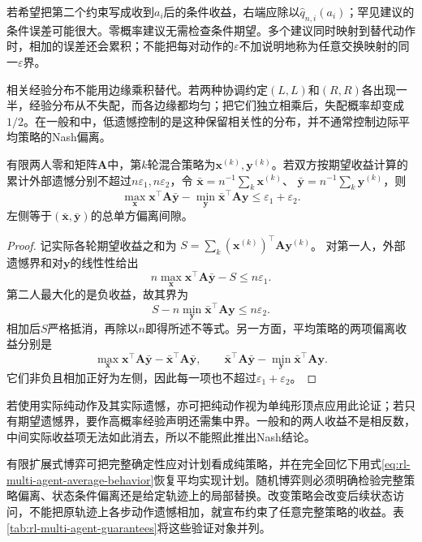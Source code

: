 若希望把第二个约束写成收到$a_i$后的条件收益，右端应除以$\hat q_{n,i}(a_i)$；罕见建议的条件误差可能很大。零概率建议无需检查条件期望。多个建议同时映射到替代动作时，相加的误差还会累积；不能把每对动作的$\varepsilon$不加说明地称为任意交换映射的同一$\varepsilon$界。

相关经验分布不能用边缘乘积替代。若两种协调约定$(L,L)$和$(R,R)$各出现一半，经验分布从不失配，而各边缘都均匀；把它们独立相乘后，失配概率却变成$1/2$。在一般和中，低遗憾控制的是这种保留相关性的分布，并不通常控制边际平均策略的Nash偏离。

\begin{theorem}[零和平均策略的鞍点间隙]
\label{thm:rl-multi-agent-average-gap}
有限两人零和矩阵$\bm A$中，第$k$轮混合策略为$\bm x^{(k)},\bm y^{(k)}$。若双方按期望收益计算的累计外部遗憾分别不超过$n\varepsilon_1,n\varepsilon_2$，令
$\bar{\bm x}=n^{-1}\sum_k\bm x^{(k)}$、
$\bar{\bm y}=n^{-1}\sum_k\bm y^{(k)}$，则
\[
 \max_{\bm x}\bm x^\top\bm A\bar{\bm y}
 -\min_{\bm y}\bar{\bm x}^\top\bm A\bm y
 \leq\varepsilon_1+\varepsilon_2.
\]
左侧等于$(\bar{\bm x},\bar{\bm y})$的总单方偏离间隙。
\end{theorem}
\begin{proof}
记实际各轮期望收益之和为
$S=\sum_k(\bm x^{(k)})^\top\bm A\bm y^{(k)}$。
对第一人，外部遗憾界和对$\bm y$的线性性给出
\[
 n\max_{\bm x}\bm x^\top\bm A\bar{\bm y}-S
 \leq n\varepsilon_1.
\]
第二人最大化的是负收益，故其界为
\[
 S-n\min_{\bm y}\bar{\bm x}^\top\bm A\bm y
 \leq n\varepsilon_2.
\]
相加后$S$严格抵消，再除以$n$即得所述不等式。另一方面，平均策略的两项偏离收益分别是
\[
 \max_{\bm x}\bm x^\top\bm A\bar{\bm y}
       -\bar{\bm x}^\top\bm A\bar{\bm y},
 \qquad
 \bar{\bm x}^\top\bm A\bar{\bm y}
       -\min_{\bm y}\bar{\bm x}^\top\bm A\bm y.
\]
它们非负且相加正好为左侧，因此每一项也不超过$\varepsilon_1+\varepsilon_2$。
\end{proof}

若使用实际纯动作及其实际遗憾，亦可把纯动作视为单纯形顶点应用此论证；若只有期望遗憾界，要作高概率经验声明还需集中界。一般和的两人收益不是相反数，中间实际收益项无法如此消去，所以不能照此推出Nash结论。

有限扩展式博弈可把完整确定性应对计划看成纯策略，并在完全回忆下用式\eqref{eq:rl-multi-agent-average-behavior}恢复平均实现计划。随机博弈则必须明确检验完整策略偏离、状态条件偏离还是给定轨迹上的局部替换。改变策略会改变后续状态访问，不能把原轨迹上各步动作遗憾相加，就宣布约束了任意完整策略的收益。表\ref{tab:rl-multi-agent-guarantees}将这些验证对象并列。

